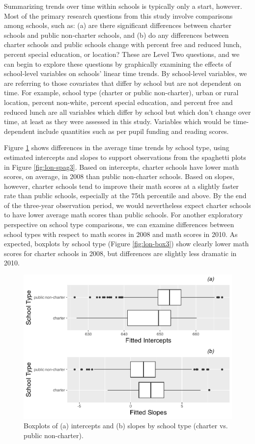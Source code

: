 \documentclass[
]{krantz}
\begin{document}
Summarizing trends over time within schools is typically only a start, however. Most of the primary research questions from this study involve comparisons among schools, such as: (a) are there significant differences between charter schools and public non-charter schools, and (b) do any differences between charter schools and public schools change with percent free and reduced lunch, percent special education, or location? These are Level Two questions, and we can begin to explore these questions by graphically examining the effects of school-level variables on schools' linear time trends. By school-level variables, we are referring to those covariates that differ by school but are not dependent on time. For example, school type (charter or public non-charter), urban or rural location, percent non-white, percent special education, and percent free and reduced lunch are all variables which differ by school but which don't change over time, at least as they were assessed in this study. Variables which would be time-dependent include quantities such as per pupil funding and reading scores.

Figure \ref{fig:lon-box2} shows differences in the average time trends by school type, using estimated intercepts and slopes to support observations from the spaghetti plots in Figure \ref{fig:lon-spag3}. Based on intercepts, charter schools have lower math scores, on average, in 2008 than public non-charter schools. Based on slopes, however, charter schools tend to improve their math scores at a slightly faster rate than public schools, especially at the 75th percentile and above. By the end of the three-year observation period, we would nevertheless expect charter schools to have lower average math scores than public schools. For another exploratory perspective on school type comparisons, we can examine differences between school types with respect to math scores in 2008 and math scores in 2010. As expected, boxplots by school type (Figure \ref{fig:lon-box3}) show clearly lower math scores for charter schools in 2008, but differences are slightly less dramatic in 2010.

\begin{figure}

{\centering \includegraphics[width=0.6\linewidth]{bookdown-BeyondMLR_files/figure-latex/lon-box2-1} 

}

\caption{Boxplots of (a) intercepts and (b) slopes by school type (charter vs. public non-charter).}\label{fig:lon-box2}
\end{figure}
\end{document}
